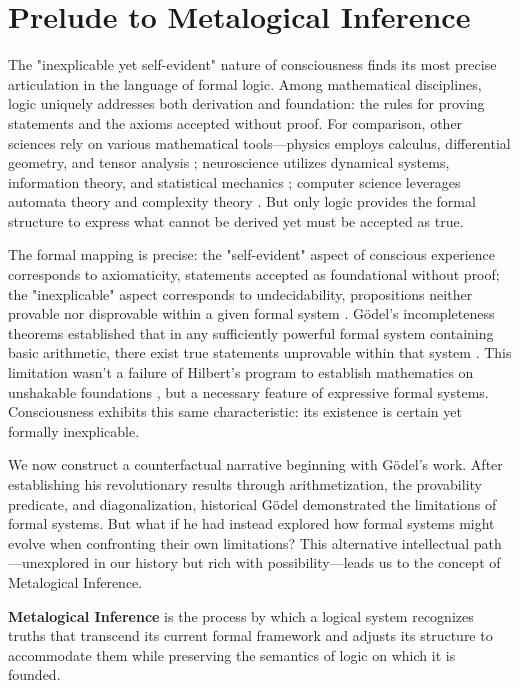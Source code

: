 \documentclass[runningheads]{llncs}
\begin{document}
\section{Prelude to Metalogical Inference}

The "inexplicable yet self-evident" nature of consciousness finds its most precise articulation in the language of formal logic. Among mathematical disciplines, logic uniquely addresses both derivation and foundation: the rules for proving statements and the axioms accepted without proof. For comparison, other sciences rely on various mathematical tools—physics employs calculus, differential geometry, and tensor analysis \cite{Landau1976,Arnold1989,Misner1973}; neuroscience utilizes dynamical systems, information theory, and statistical mechanics \cite{Dayan2001,Friston2010,Hopfield1982}; computer science leverages automata theory and complexity theory \cite{Sipser2012}. But only logic provides the formal structure to express what cannot be derived yet must be accepted as true.

The formal mapping is precise: the "self-evident" aspect of conscious experience corresponds to axiomaticity, statements accepted as foundational without proof; the "inexplicable" aspect corresponds to undecidability, propositions neither provable nor disprovable within a given formal system \cite{Mendelson2009}. Gödel's incompleteness theorems established that in any sufficiently powerful formal system containing basic arithmetic, there exist true statements unprovable within that system \cite{Godel1931}. This limitation wasn't a failure of Hilbert's program to establish mathematics on unshakable foundations \cite{Hilbert1922}, but a necessary feature of expressive formal systems. Consciousness exhibits this same characteristic: its existence is certain yet formally inexplicable.

We now construct a counterfactual narrative beginning with Gödel's work. After establishing his revolutionary results through arithmetization, the provability predicate, and diagonalization, historical Gödel demonstrated the limitations of formal systems. But what if he had instead explored how formal systems might evolve when confronting their own limitations? This alternative intellectual path—unexplored in our history but rich with possibility—leads us to the concept of Metalogical Inference.

\setcounter{definition}{1}
\begin{cdefinition}
    \textbf{Metalogical Inference} is the process by which a logical system recognizes truths that transcend its current formal framework and adjusts its structure to accommodate them while preserving the semantics of logic on which it is founded.
\end{cdefinition}
\end{document}
